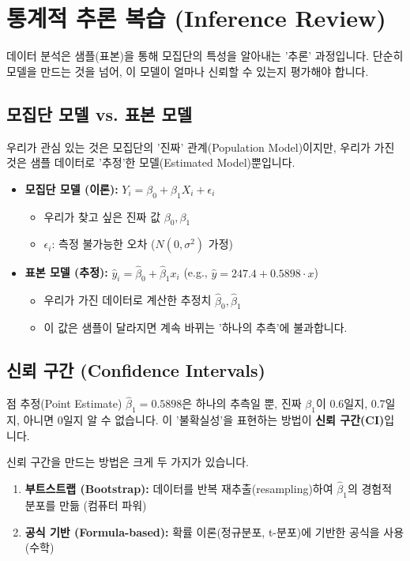 \documentclass[11pt,a4paper]{book}
\theoremstyle{definition}
\begin{document}
\section{통계적 추론 복습 (Inference Review)}

데이터 분석은 샘플(표본)을 통해 모집단의 특성을 알아내는 '추론' 과정입니다.
단순히 모델을 만드는 것을 넘어, 이 모델이 얼마나 신뢰할 수 있는지 평가해야 합니다.

\subsection{모집단 모델 vs. 표본 모델}

우리가 관심 있는 것은 모집단의 '진짜' 관계(Population Model)이지만, 우리가 가진 것은 샘플 데이터로 '추정'한 모델(Estimated Model)뿐입니다.

\begin{itemize}
    \item \textbf{모집단 모델 (이론):} $Y_i = \beta_0 + \beta_1 X_i + \epsilon_i$
        \begin{itemize}
            \item 우리가 찾고 싶은 진짜 값 $\beta_0, \beta_1$
            \item $\epsilon_i$: 측정 불가능한 오차 ($N(0, \sigma^2)$ 가정)
        \end{itemize}
    \item \textbf{표본 모델 (추정):} $\hat{y}_i = \hat{\beta}_0 + \hat{\beta}_1 x_i$ (e.g., $\hat{y} = 247.4 + 0.5898 \cdot x$)
        \begin{itemize}
            \item 우리가 가진 데이터로 계산한 추정치 $\hat{\beta}_0, \hat{\beta}_1$
            \item 이 값은 샘플이 달라지면 계속 바뀌는 '하나의 추측'에 불과합니다.
        \end{itemize}
\end{itemize}

\subsection{신뢰 구간 (Confidence Intervals)}

점 추정(Point Estimate) $\hat{\beta}_1 = 0.5898$은 하나의 추측일 뿐, 진짜 $\beta_1$이 0.6일지, 0.7일지, 아니면 0일지 알 수 없습니다.
이 '불확실성'을 표현하는 방법이 \textbf{신뢰 구간(CI)}입니다.

신뢰 구간을 만드는 방법은 크게 두 가지가 있습니다.
\begin{enumerate}
    \item \textbf{부트스트랩 (Bootstrap):} 데이터를 반복 재추출(resampling)하여 $\hat{\beta}_1$의 경험적 분포를 만듦 (컴퓨터 파워)
    \item \textbf{공식 기반 (Formula-based):} 확률 이론(정규분포, t-분포)에 기반한 공식을 사용 (수학)
\end{enumerate}
\end{document}
